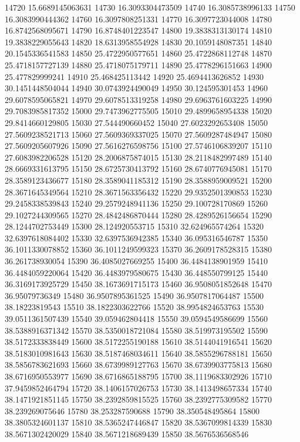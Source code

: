 {14720 15.6689145063631
14730 16.3093304473509
14740 16.3085738996133
14750 16.3083990444362
14760 16.3097808251331
14770 16.3097723044008
14780 16.8742568095671
14790 16.8748401223547
14800 19.3838313130174
14810 19.3838229055643
14820 18.6313958554928
14830 20.1059148087351
14840 20.1545336541583
14850 25.4722950577651
14860 25.4722868112748
14870 25.4718157727139
14880 25.4718075179711
14890 25.4778296151663
14900 25.477829999241
14910 25.468425113442
14920 25.4694413626852
14930 30.1451448504044
14940 30.0743924490049
14950 30.124595301453
14960 29.6078595065821
14970 29.6078513319258
14980 29.6963761603225
14990 29.7083985817352
15000 29.7473962775505
15010 29.4899658954338
15020 29.8414660129805
15030 27.544490660452
15040 27.6023292653408
15050 27.5609238521713
15060 27.5609369337025
15070 27.5609287484947
15080 27.5609205607926
15090 27.5616276598756
15100 27.5746106839207
15110 27.6083982206528
15120 28.2006875874015
15130 28.2118482997489
15140 28.6669331613795
15150 28.6725730413792
15160 28.6740776945081
15170 28.3589123436677
15180 28.3589041185312
15190 28.3588959009521
15200 28.3671645349564
15210 28.3671563356432
15220 29.9352501390853
15230 29.2458338539843
15240 29.2579248941136
15250 29.100728170869
15260 29.1027244309565
15270 28.4842486870444
15280 28.4289526156654
15290 28.1244702753449
15300 28.124920553715
15310 32.624965574264
15320 32.6397618084402
15330 32.6397536942385
15340 36.095316546787
15350 36.1011330078852
15360 36.1011249599323
15370 36.2609178528315
15380 36.261738930054
15390 36.4085027669255
15400 36.4484138901959
15410 36.4484059220064
15420 36.4483979580675
15430 36.448550799125
15440 36.3169173925729
15450 38.1673691715173
15460 36.9508051852648
15470 36.95079736349
15480 36.9507895361525
15490 36.9507817064487
15500 38.18223819543
15510 38.1822303622766
15520 38.9954824653763
15530 39.0511361507439
15540 39.059462804418
15550 39.0594549586699
15560 38.5388916371342
15570 38.5350018721084
15580 38.519973195502
15590 38.5172333838449
15600 38.5172255190188
15610 38.5144041916541
15620 38.5183010981643
15630 38.5187468034611
15640 38.5855296788181
15650 38.5856783621693
15660 38.6739989127763
15670 38.6739903775813
15680 38.6716950553977
15690 38.6716865188795
15700 38.1119683302926
15710 37.9459852464794
15720 38.1406157026753
15730 38.1413498657334
15740 38.1471921851145
15750 38.2392859815525
15760 38.2392775309582
15770 38.239269075646
15780 38.253287590688
15790 38.350548495864
15800 38.3805324601137
15810 38.5365247446847
15820 38.5367099814339
15830 38.5671302420029
15840 38.5671218689439
15850 38.5676536568546
}

